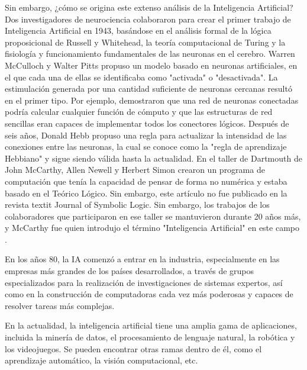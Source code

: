 Sin embargo, ¿cómo se origina este extenso análisis de la Inteligencia Artificial? Dos investigadores de neurociencia colaboraron para crear el primer trabajo de Inteligencia Artificial en 1943, basándose en el análisis formal de la lógica proposicional de Russell y Whitehead, la teoría computacional de Turing y la fisiología y funcionamiento fundamentales de las neuronas en el cerebro. Warren McCulloch y Walter Pitts propuso un modelo basado en neuronas artificiales, en el que cada una de ellas se identificaba como "activada" o "desactivada". La estimulación generada por una cantidad suficiente de neuronas cercanas resultó en el primer tipo. Por ejemplo, demostraron que una red de neuronas conectadas podría calcular cualquier función de cómputo y que las estructuras de red sencillas eran capaces de implementar todos los conectores lógicos. Después de seis años, Donald Hebb propuso una regla para actualizar la intensidad de las conexiones entre las neuronas, la cual se conoce como la "regla de aprendizaje Hebbiano" y sigue siendo válida hasta la actualidad. En el taller de Dartmouth de John McCarthy, Allen Newell y Herbert Simon crearon un programa de computación que tenía la capacidad de pensar de forma no numérica y estaba basado en el Teórico Lógico. Sin embargo, este artículo no fue publicado en la revista textit Journal of Symbolic Logic. Sin embargo, los trabajos de los colaboradores que participaron en ese taller se mantuvieron durante 20 años más, y McCarthy fue quien introdujo el término "Inteligencia Artificial" en este campo \parencite{bk_russell2004intart}.

En los años 80, la IA comenzó a entrar en la industria, especialmente en las empresas más grandes de los países desarrollados, a través de grupos especializados para la realización de investigaciones de sistemas expertos, así como en la construcción de computadoras cada vez más poderosas y capaces de resolver tareas más complejas.

En la actualidad, la inteligencia artificial tiene una amplia gama de aplicaciones, incluida la minería de datos, el procesamiento de lenguaje natural, la robótica y los videojuegos. Se pueden encontrar otras ramas dentro de él, como el aprendizaje automático, la visión computacional, etc.

